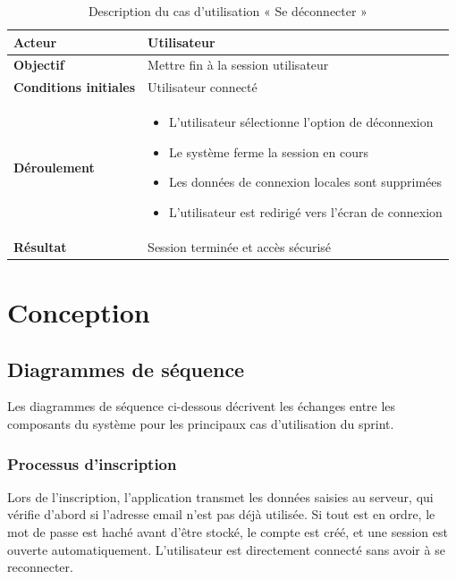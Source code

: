 \begin{table}[H]
\centering
\renewcommand{\arraystretch}{1.2}
\begin{tabular}{|p{4cm}|p{10cm}|}
\hline
\textbf{Acteur} & Utilisateur \\ \hline

\textbf{Objectif} & Mettre fin à la session utilisateur \\ \hline

\textbf{Conditions initiales} & Utilisateur connecté \\ \hline

\textbf{Déroulement} &
\begin{itemize}
    \item L’utilisateur sélectionne l’option de déconnexion
    \item Le système ferme la session en cours
    \item Les données de connexion locales sont supprimées
    \item L’utilisateur est redirigé vers l’écran de connexion
\end{itemize} \\ \hline

\textbf{Résultat} & Session terminée et accès sécurisé \\ \hline
\end{tabular}
\caption{Description du cas d’utilisation « Se déconnecter »}
\label{tab:uc_logout}
\end{table}

\section{Conception}
\subsection{Diagrammes de séquence}

Les diagrammes de séquence ci-dessous décrivent les échanges entre les composants du système pour les principaux cas d’utilisation du sprint.

\subsubsection{Processus d’inscription}

Lors de l’inscription, l’application transmet les données saisies au serveur, qui vérifie d’abord si l’adresse email n’est pas déjà utilisée. Si tout est en ordre, le mot de passe est haché avant d’être stocké, le compte est créé, et une session est ouverte automatiquement. L’utilisateur est directement connecté sans avoir à se reconnecter.

